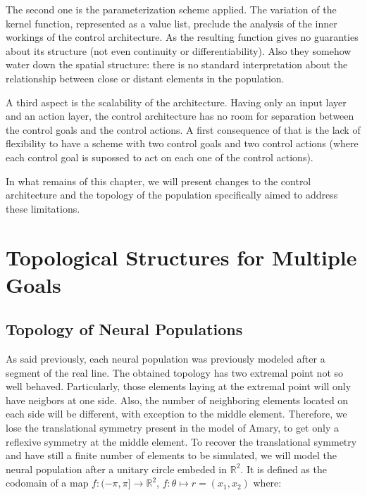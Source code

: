The second one is the parameterization scheme applied. The variation of the kernel function, represented as a value list, preclude the analysis of the inner workings of the control architecture. As the resulting function gives no guaranties about its structure (not even continuity or differentiability). Also they somehow water down the spatial structure: there is no standard interpretation about the relationship between close or distant elements in the population.

A third aspect is the scalability of the architecture. Having only an input layer and an action layer, the control architecture has no room for separation between the control goals and the control actions. A first consequence of that is the lack of flexibility to have a scheme with two control goals and two control actions (where each control goal is supossed to act on each one of the control actions). 

In what remains of this chapter, we will present changes to the control architecture and the topology of the population specifically aimed to address these limitations.
\label{sec:chp3-introduction}


\section{Topological Structures for Multiple Goals}
\label{sec:chp3-topological}
\subsection{Topology of Neural Populations}
As said previously, each neural population was previously modeled after a segment of the real line. The obtained topology has two extremal point not so well behaved. Particularly, those elements laying at the extremal point will only have neigbors at one side. Also, the number of neighboring elements located on each side will be different, with exception to the middle element. Therefore, we lose the translational symmetry present in the model of Amary, to get only a reflexive symmetry at the middle element. To recover the translational symmetry and have still a finite number of elements to be simulated, we will model the neural population after a unitary circle embeded in $\mathbb{R}^2$. It is defined as the codomain of a map $f: (-\pi,\pi]\rightarrow \mathbb{R}^2$, $f:\theta \mapsto r=(x_1,x_2)$ where:  

